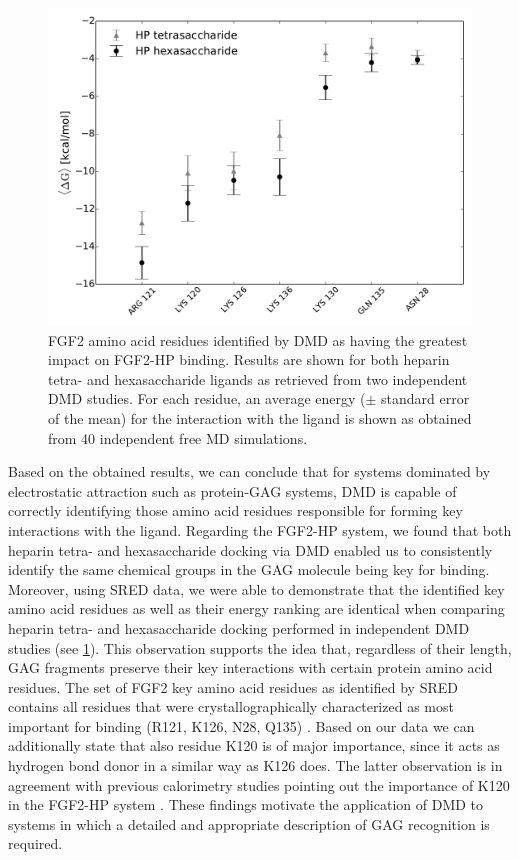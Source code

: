 \begin{figure}
\centering
\includegraphics[width=1.0\textwidth]{gfx/dmd/figure_6_receptor_top7_residues_of_top_40percent_dmd_runs.pdf}
\caption[]{
FGF2 amino acid residues identified by DMD as having the greatest impact on
FGF2-HP binding. Results are shown for both heparin tetra- and hexasaccharide
ligands as retrieved from two independent DMD studies. For each residue, an
average energy ($\pm$ standard error of the mean) for the interaction with the
ligand is shown as obtained from 40 independent free MD simulations.
}
\label{fig:dmd:sred_fgf2}
\end{figure}

Based on the obtained results, we can conclude that for systems dominated by
electrostatic attraction such as protein-GAG systems, DMD is capable of
correctly identifying those amino acid residues responsible for forming key
interactions with the ligand. Regarding the FGF2-HP system, we found that both
heparin tetra- and hexasaccharide docking via DMD enabled us to consistently
identify the same chemical groups in the GAG molecule being key for binding.
Moreover, using SRED data, we were able to demonstrate that the identified key
amino acid residues as well as their energy ranking are identical when comparing
heparin tetra- and hexasaccharide docking performed in independent DMD studies
(see \cref{fig:dmd:sred_fgf2}). This observation supports the idea that,
regardless of their length, GAG fragments preserve their key interactions with
certain protein amino acid residues. The set of FGF2 key amino acid residues as
identified by SRED contains all residues that were crystallographically
characterized as most important for binding (R121, K126, N28,
Q135) \cite{faham_heparin_1996}. Based on our data we can additionally state
that also residue K120 is of major importance, since it acts as hydrogen bond
donor in a similar way as K126 does. The latter observation is in agreement with
previous calorimetry studies pointing out the importance of K120 in the FGF2-HP
system \cite{thompson_1994_fgf2_heparin}. These findings motivate the
application of DMD to systems in which a detailed and appropriate description of
GAG recognition is required.



